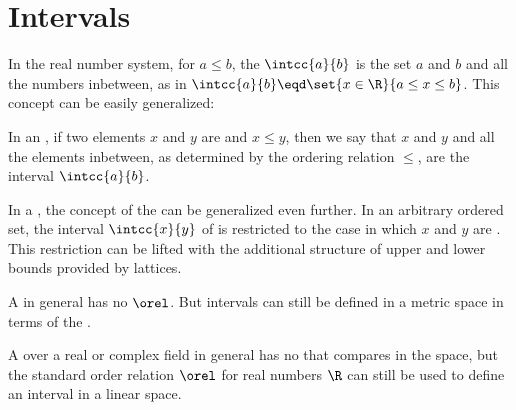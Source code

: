 \section{Intervals}
In the real number system, for $a\le b$, the  $\intcc{a}{b}$
is the set $a$ and $b$ and all the numbers inbetween, as in
$\intcc{a}{b}\eqd\set{x\in\R}{a\le x\le b}$.
This concept can be easily generalized:
\begin{listi}
  \item In an , \label{item:intcc_order}
        if two elements $x$ and $y$ are  and $x\le y$,
        then we say that $x$ and $y$ and all the elements inbetween,
        as determined by the ordering relation $\le$, are the interval $\intcc{a}{b}$.

  \item In a ,
        the concept of the  can be generalized even further.
        In an arbitrary ordered set, the interval $\intcc{x}{y}$ of  is restricted to the case in 
        which $x$ and $y$ are .
        This restriction can be lifted  with the additional structure of 
        upper and lower bounds provided by lattices.

  \item A  in general has no  $\orel$. 
        But intervals can still be defined  in a metric space in terms of the .

  \item A  over a real or complex field 
       in general has no  that compares  in the space,
       but the standard order relation $\orel$ for real numbers $\R$ can still be used 
       to define an interval in a linear space.
\end{listi}

